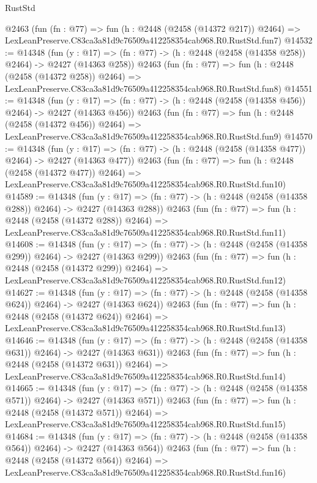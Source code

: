 \begin{lexlean}{RustStd}
\begin{coremodule}
    @2463
    (fun (fn : @77) =>
    fun (h : @2448 (@2458 (@14372 @217)) @2464) =>
    LexLeanPreserve.C83ca3a81d9c76509a412258354cab968.R0.RustStd.fun7)
@14532 := @14348
    (fun (y : @17) => (fn : @77) -> (h : @2448 (@2458 (@14358 @258)) @2464) -> @2427 (@14363 @258))
    @2463
    (fun (fn : @77) =>
    fun (h : @2448 (@2458 (@14372 @258)) @2464) =>
    LexLeanPreserve.C83ca3a81d9c76509a412258354cab968.R0.RustStd.fun8)
@14551 := @14348
    (fun (y : @17) => (fn : @77) -> (h : @2448 (@2458 (@14358 @456)) @2464) -> @2427 (@14363 @456))
    @2463
    (fun (fn : @77) =>
    fun (h : @2448 (@2458 (@14372 @456)) @2464) =>
    LexLeanPreserve.C83ca3a81d9c76509a412258354cab968.R0.RustStd.fun9)
@14570 := @14348
    (fun (y : @17) => (fn : @77) -> (h : @2448 (@2458 (@14358 @477)) @2464) -> @2427 (@14363 @477))
    @2463
    (fun (fn : @77) =>
    fun (h : @2448 (@2458 (@14372 @477)) @2464) =>
    LexLeanPreserve.C83ca3a81d9c76509a412258354cab968.R0.RustStd.fun10)
@14589 := @14348
    (fun (y : @17) => (fn : @77) -> (h : @2448 (@2458 (@14358 @288)) @2464) -> @2427 (@14363 @288))
    @2463
    (fun (fn : @77) =>
    fun (h : @2448 (@2458 (@14372 @288)) @2464) =>
    LexLeanPreserve.C83ca3a81d9c76509a412258354cab968.R0.RustStd.fun11)
@14608 := @14348
    (fun (y : @17) => (fn : @77) -> (h : @2448 (@2458 (@14358 @299)) @2464) -> @2427 (@14363 @299))
    @2463
    (fun (fn : @77) =>
    fun (h : @2448 (@2458 (@14372 @299)) @2464) =>
    LexLeanPreserve.C83ca3a81d9c76509a412258354cab968.R0.RustStd.fun12)
@14627 := @14348
    (fun (y : @17) => (fn : @77) -> (h : @2448 (@2458 (@14358 @624)) @2464) -> @2427 (@14363 @624))
    @2463
    (fun (fn : @77) =>
    fun (h : @2448 (@2458 (@14372 @624)) @2464) =>
    LexLeanPreserve.C83ca3a81d9c76509a412258354cab968.R0.RustStd.fun13)
@14646 := @14348
    (fun (y : @17) => (fn : @77) -> (h : @2448 (@2458 (@14358 @631)) @2464) -> @2427 (@14363 @631))
    @2463
    (fun (fn : @77) =>
    fun (h : @2448 (@2458 (@14372 @631)) @2464) =>
    LexLeanPreserve.C83ca3a81d9c76509a412258354cab968.R0.RustStd.fun14)
@14665 := @14348
    (fun (y : @17) => (fn : @77) -> (h : @2448 (@2458 (@14358 @571)) @2464) -> @2427 (@14363 @571))
    @2463
    (fun (fn : @77) =>
    fun (h : @2448 (@2458 (@14372 @571)) @2464) =>
    LexLeanPreserve.C83ca3a81d9c76509a412258354cab968.R0.RustStd.fun15)
@14684 := @14348
    (fun (y : @17) => (fn : @77) -> (h : @2448 (@2458 (@14358 @564)) @2464) -> @2427 (@14363 @564))
    @2463
    (fun (fn : @77) =>
    fun (h : @2448 (@2458 (@14372 @564)) @2464) =>
    LexLeanPreserve.C83ca3a81d9c76509a412258354cab968.R0.RustStd.fun16)

\end{coremodule}
\end{lexlean}
